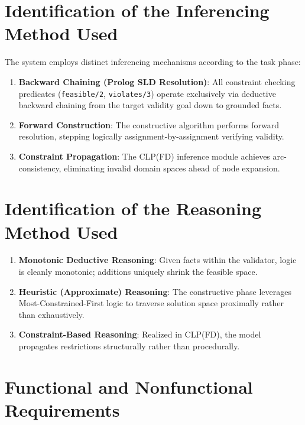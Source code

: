 \documentclass[11pt,letterpaper]{article}
\begin{document}
\section{Identification of the Inferencing Method Used}
The system employs distinct inferencing mechanisms according to the task phase:
\begin{enumerate}[nosep]
  \item \textbf{Backward Chaining (Prolog SLD Resolution)}: All constraint checking predicates (\texttt{feasible/2}, \texttt{violates/3}) operate exclusively via deductive backward chaining from the target validity goal down to grounded facts.
  \item \textbf{Forward Construction}: The constructive algorithm performs forward resolution, stepping logically assignment-by-assignment verifying validity.
  \item \textbf{Constraint Propagation}: The CLP(FD) inference module achieves arc-consistency, eliminating invalid domain spaces ahead of node expansion.
\end{enumerate}

\section{Identification of the Reasoning Method Used}
\begin{enumerate}[nosep]
  \item \textbf{Monotonic Deductive Reasoning}: Given facts within the validator, logic is cleanly monotonic; additions uniquely shrink the feasible space.
  \item \textbf{Heuristic (Approximate) Reasoning}: The constructive phase leverages Most-Constrained-First logic to traverse solution space proximally rather than exhaustively.
  \item \textbf{Constraint-Based Reasoning}: Realized in CLP(FD), the model propagates restrictions structurally rather than procedurally.
\end{enumerate}

\section{Functional and Nonfunctional Requirements}
\end{document}

